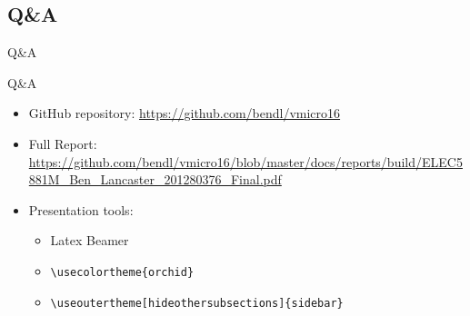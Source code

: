 \documentclass[aspectratio=169]{beamer}
\begin{document}
\subsection{Q\&A}
\begin{frame}[c]
\begin{center}
\Huge Q\&A
\end{center}

\end{frame}

\begin{frame}[fragile]{Q\&A}
\begin{itemize}\setlength{\itemsep 1em}
    \item GitHub repository: \url{https://github.com/bendl/vmicro16}
    \item Full Report: \url{https://github.com/bendl/vmicro16/blob/master/docs/reports/build/ELEC5881M_Ben_Lancaster_201280376_Final.pdf}
    \item Presentation tools:
    \begin{itemize}\setlength{\itemsep 1em}
        \item Latex Beamer
        \item \verb|\usecolortheme{orchid}|
        \item \verb|\useoutertheme[hideothersubsections]{sidebar}|
    \end{itemize}
\end{itemize}
\end{frame}
\end{document}
